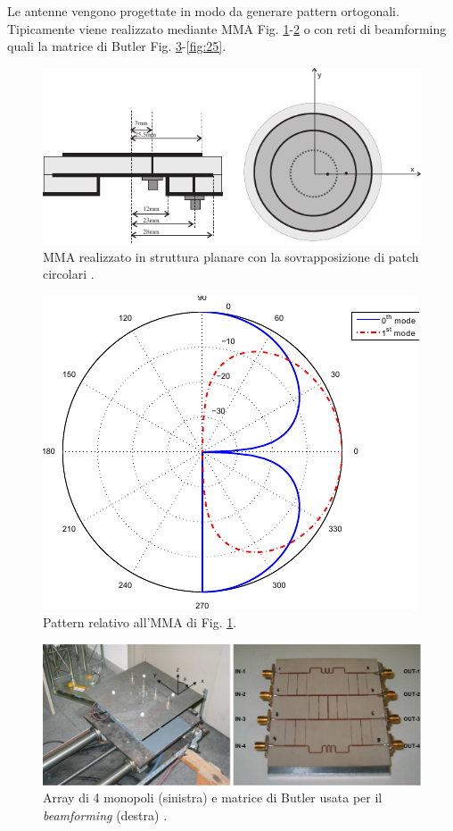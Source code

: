 \documentclass[technote]{IEEEtran}
\begin{document}
\par Le antenne vengono progettate in modo da generare pattern ortogonali. Tipicamente viene realizzato mediante MMA Fig. \ref{fig:22}-\ref{fig:23} o con reti di {beamforming} quali la matrice di Butler Fig. \ref{fig:24}-\ref{fig:25}.
\begin{figure}[!h]
\centering
\includegraphics[width=.9\columnwidth]{figure22}
\caption{MMA realizzato in struttura planare con la sovrapposizione di patch circolari \cite{Herscovici}.}
\label{fig:22}
\end{figure}

\begin{figure}[!h]
\centering
\includegraphics[width=.65\columnwidth]{figure23}
\caption{Pattern relativo all'MMA di Fig. \ref{fig:22}.}
\label{fig:23}
\end{figure}

\begin{figure}[!h]
\centering
\includegraphics[width=.9\columnwidth]{figure24}
\caption{Array di 4 monopoli (sinistra) e matrice di Butler usata per il \textit{beamforming} (destra) \cite{Grau2006}.}
\label{fig:24}
\end{figure}
\end{document}
